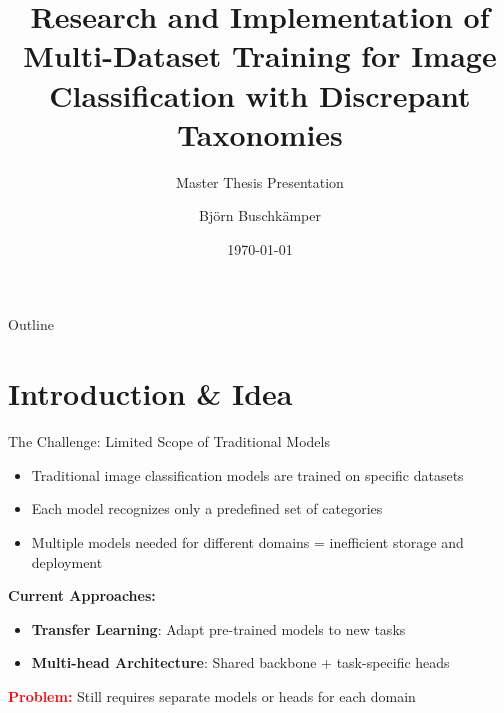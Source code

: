 \documentclass[aspectratio=169]{beamer}
\title{Research and Implementation of Multi-Dataset Training for Image Classification with Discrepant Taxonomies}
\subtitle{Master Thesis Presentation}
\author{Björn Buschkämper}
\institute{Technical Faculty, Bielefeld University}
\date{\today}
\begin{document}
\begin{frame}
    \titlepage
\end{frame}

\begin{frame}{Outline}
    \tableofcontents
\end{frame}

\section{Introduction \& Idea}

\begin{frame}{The Challenge: Limited Scope of Traditional Models}
    \begin{itemize}
        \item Traditional image classification models are trained on specific datasets
        \item Each model recognizes only a predefined set of categories
        \item Multiple models needed for different domains = inefficient storage and deployment
    \end{itemize}

    \vspace{1em}

    \textbf{Current Approaches:}
    \begin{itemize}
        \item \textbf{Transfer Learning}: Adapt pre-trained models to new tasks
        \item \textbf{Multi-head Architecture}: Shared backbone + task-specific heads
    \end{itemize}

    \vspace{1em}

    \textcolor{red}{\textbf{Problem:}} Still requires separate models or heads for each domain
\end{frame}
\end{document}
